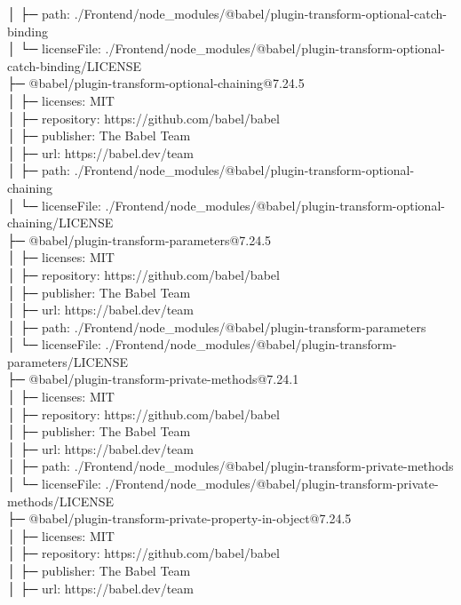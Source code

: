 │  ├─ path: ./Frontend/node\_modules/@babel/plugin-transform-optional-catch-binding\\
│  └─ licenseFile: ./Frontend/node\_modules/@babel/plugin-transform-optional-catch-binding/LICENSE\\
├─ @babel/plugin-transform-optional-chaining@7.24.5\\
│  ├─ licenses: MIT\\
│  ├─ repository: https://github.com/babel/babel\\
│  ├─ publisher: The Babel Team\\
│  ├─ url: https://babel.dev/team\\
│  ├─ path: ./Frontend/node\_modules/@babel/plugin-transform-optional-chaining\\
│  └─ licenseFile: ./Frontend/node\_modules/@babel/plugin-transform-optional-chaining/LICENSE\\
├─ @babel/plugin-transform-parameters@7.24.5\\
│  ├─ licenses: MIT\\
│  ├─ repository: https://github.com/babel/babel\\
│  ├─ publisher: The Babel Team\\
│  ├─ url: https://babel.dev/team\\
│  ├─ path: ./Frontend/node\_modules/@babel/plugin-transform-parameters\\
│  └─ licenseFile: ./Frontend/node\_modules/@babel/plugin-transform-parameters/LICENSE\\
├─ @babel/plugin-transform-private-methods@7.24.1\\
│  ├─ licenses: MIT\\
│  ├─ repository: https://github.com/babel/babel\\
│  ├─ publisher: The Babel Team\\
│  ├─ url: https://babel.dev/team\\
│  ├─ path: ./Frontend/node\_modules/@babel/plugin-transform-private-methods\\
│  └─ licenseFile: ./Frontend/node\_modules/@babel/plugin-transform-private-methods/LICENSE\\
├─ @babel/plugin-transform-private-property-in-object@7.24.5\\
│  ├─ licenses: MIT\\
│  ├─ repository: https://github.com/babel/babel\\
│  ├─ publisher: The Babel Team\\
│  ├─ url: https://babel.dev/team\\
